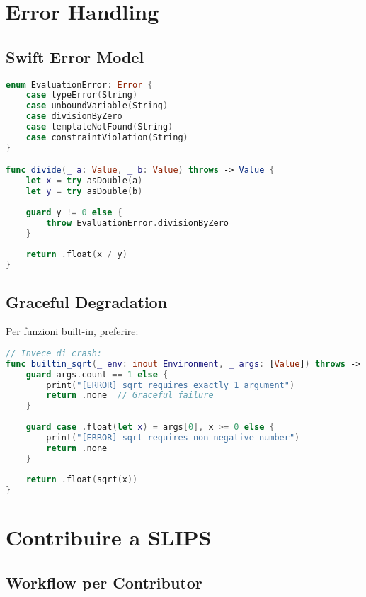 \section{Error Handling}

\subsection{Swift Error Model}

\begin{lstlisting}[language=Swift]
enum EvaluationError: Error {
    case typeError(String)
    case unboundVariable(String)
    case divisionByZero
    case templateNotFound(String)
    case constraintViolation(String)
}

func divide(_ a: Value, _ b: Value) throws -> Value {
    let x = try asDouble(a)
    let y = try asDouble(b)
    
    guard y != 0 else {
        throw EvaluationError.divisionByZero
    }
    
    return .float(x / y)
}
\end{lstlisting}

\subsection{Graceful Degradation}

Per funzioni built-in, preferire:

\begin{lstlisting}[language=Swift]
// Invece di crash:
func builtin_sqrt(_ env: inout Environment, _ args: [Value]) throws -> Value {
    guard args.count == 1 else {
        print("[ERROR] sqrt requires exactly 1 argument")
        return .none  // Graceful failure
    }
    
    guard case .float(let x) = args[0], x >= 0 else {
        print("[ERROR] sqrt requires non-negative number")
        return .none
    }
    
    return .float(sqrt(x))
}
\end{lstlisting}

\section{Contribuire a SLIPS}

\subsection{Workflow per Contributor}

